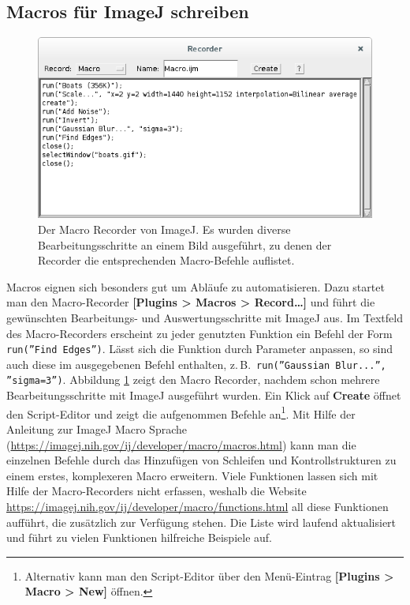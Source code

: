 \documentclass[
	paper=a4,				%
	twoside=true,			%
	BCOR=6mm,				%
	fontsize=12pt,			%
	pagesize=auto,			%
	numbers=noenddot,		%
	bibliography=totoc,		%
	draft=false
]{scrartcl}
\begin{document}
\subsection*{Macros für ImageJ schreiben}

\begin{figure}
	\centering
	\includegraphics[width=1\linewidth]{Bilder/ImageJ_Macro_Recorder}
	\caption{Der Macro Recorder von ImageJ. Es wurden diverse Bearbeitungsschritte an einem Bild ausgeführt, zu denen der Recorder die entsprechenden Macro-Befehle auflistet.}
	\label{fig:ImageJ_Macro_Recorder}
\end{figure}

Macros eignen sich besonders gut um Abläufe zu automatisieren. Dazu startet man den Macro-Recorder \textbf{[Plugins > Macros > Record\ldots]} und führt die gewünschten Bearbeitungs- und Auswertungsschritte mit ImageJ aus. Im Textfeld des Macro-Recorders erscheint zu jeder genutzten Funktion ein Befehl der Form \texttt{run(''Find Edges'')}. Lässt sich die Funktion durch Parameter anpassen, so sind auch diese im ausgegebenen Befehl enthalten, z.\,B.\ \texttt{run(''Gaussian Blur...'', ''sigma=3'')}. Abbildung \ref{fig:ImageJ_Macro_Recorder} zeigt den Macro Recorder, nachdem schon mehrere Bearbeitungsschritte mit ImageJ ausgeführt wurden. Ein Klick auf \textbf{Create} öffnet den Script-Editor und zeigt die aufgenommen Befehle an\footnote{Alternativ kann man den Script-Editor über den Menü-Eintrag \textbf{[Plugins > Macro > New]} öffnen.}. Mit Hilfe der Anleitung zur ImageJ Macro Sprache (\url{https://imagej.nih.gov/ij/developer/macro/macros.html}) kann man die einzelnen Befehle durch das Hinzufügen von Schleifen und Kontrollstrukturen zu einem erstes, komplexeren Macro erweitern. Viele Funktionen lassen sich mit Hilfe der Macro-Recorders nicht erfassen, weshalb die Website \url{https://imagej.nih.gov/ij/developer/macro/functions.html} all diese Funktionen aufführt, die zusätzlich zur Verfügung stehen. Die Liste wird laufend aktualisiert und führt zu vielen Funktionen hilfreiche Beispiele auf.
\end{document}

